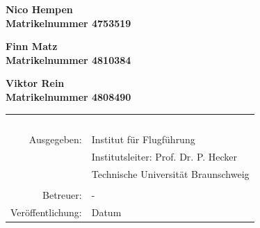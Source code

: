 \begin{titlepage}
 \textbf{\large Nico Hempen} \\[0.5ex]
 \textbf{Matrikelnummer 4753519}
 
 \textbf{\large Finn Matz} \\[0.5ex]
 \textbf{Matrikelnummer 4810384}

 \textbf{\large Viktor Rein} \\[0.5ex]
 \textbf{Matrikelnummer 4808490}
 

 

 



 \vspace*{2.5cm}

 \begin{table}[htbp]
  \begin{center}
   \begin{tabular}{rl} 
     \parbox{0.33\textwidth}{\mbox{ }} & \parbox{0.66\textwidth}{\mbox{ }} \\
     Ausgegeben: & Institut f\" ur Flugf\" uhrung \\
                 & Institutsleiter: Prof. Dr. P. Hecker \\
                 & Technische Universit\"at Braunschweig \\
                 &  \\
       Betreuer: & -\\
 Ver\"offentlichung: & Datum \\
   \end{tabular}
  \end{center}
 \end{table}



\end{titlepage}

